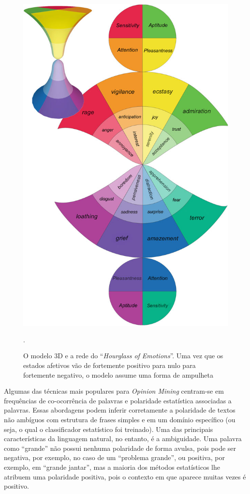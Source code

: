 \documentclass[
	12pt,				%
	openright,			%
	oneside,			%
	a4paper,			%
	english,			%
	spanish,			%
	brazil				%
	]{abntex2}
\begin{document}
\begin{figure}[H]
\centering
\includegraphics[scale=1.4]{SenticHourGlass}
\caption {O modelo 3D e a rede do ``\emph{Hourglass of Emotions}''. Uma vez que os estados afetivos vão de fortemente positivo para nulo para fortemente negativo, o modelo assume uma forma de ampulheta \cite{book_Cambria2015}}.
\label{SenticHourGlass}
\end{figure}

Algumas das técnicas mais populares para \emph{Opinion Mining} centram-se em frequências de co-ocorrência de palavras e polaridade estatística associadas a palavras. Essas abordagens podem inferir corretamente a polaridade de textos não ambíguos com estrutura de frases simples e em um domínio específico (ou seja, o qual o classificador estatístico foi treinado). Uma das principais características da linguagem natural, no entanto, é a ambiguidade. Uma palavra como ``grande'' não possui nenhuma polaridade de forma avulsa, pois pode ser negativa, por exemplo, no caso de um ``problema grande'', ou positiva, por exemplo, em ``grande jantar'', mas a maioria dos métodos estatísticos lhe atribuem uma polaridade positiva, pois o contexto em que aparece muitas vezes é positivo.
\end{document}
